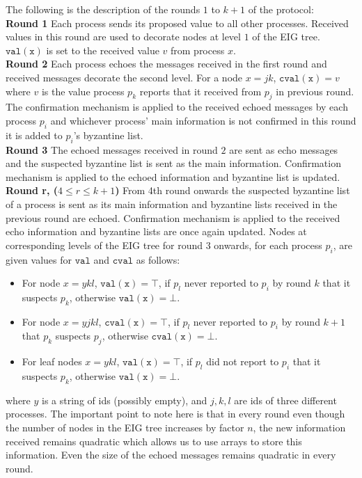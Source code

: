     The following is the description of the rounds $1$ to $k+1$ of the protocol: \\
    \textbf{Round 1} Each process sends its proposed value to all other processes. Received values in this round are used to decorate nodes at level $1$ of the EIG tree. $\mathtt{val(x)}$ is set to the received value $v$ from process $x$. \\
    \textbf{Round 2} Each process echoes the messages received in the first round and received messages decorate the second level. For a node $x = jk$, $\mathtt{cval(x)} = v$ where $v$ is the value process $p_k$ reports that it received from $p_j$ in previous round. The confirmation mechanism is applied to the received echoed messages by each process $p_i$ and whichever process' main information is not confirmed in this round it is added to $p_i$'s byzantine list. \\
    \textbf{Round 3} The echoed messages received in round $2$ are sent as echo messages and the suspected byzantine list is sent as the main information. Confirmation mechanism is applied to the echoed information and byzantine list is updated. \\
    \textbf{Round r, ($4 \leq r \leq k+1$)} From 4th round onwards the suspected byzantine list of a process is sent as its main information and byzantine lists received in the previous round are echoed. Confirmation mechanism is applied to the received echo information and byzantine lists are once again updated. Nodes at corresponding levels of the EIG tree for round 3 onwards, for each process $p_i$, are given values for $\mathtt{val}$ and $\mathtt{cval}$ as follows:
    \begin{itemize}
        \item For node $x=ykl$, $\mathtt{val(x)} = \top$, if $p_l$ never reported to $p_i$ by round $k$ that it suspects $p_k$, otherwise $\mathtt{val(x)} = \bot$.
        \item For node $x=yjkl$, $\mathtt{cval(x)} = \top$, if $p_l$ never reported to $p_i$ by round $k+1$ that $p_k$ suspects $p_j$, otherwise $\mathtt{cval(x)} = \bot$.
        \item For leaf nodes $x = ykl$, $\mathtt{val(x)} = \top$, if $p_l$ did not report to $p_i$ that it suspects $p_k$, otherwise $\mathtt{val(x)} = \bot$.
    \end{itemize}
where $y$ is a string of ids (possibly empty), and $j, k, l$ are ids of three different processes. The important point to note here is that in every round even though the number of nodes in the EIG tree increases by factor $n$, the new information received remains quadratic which allows us to use arrays to store this information. Even the size of the echoed messages remains quadratic in every round. 

